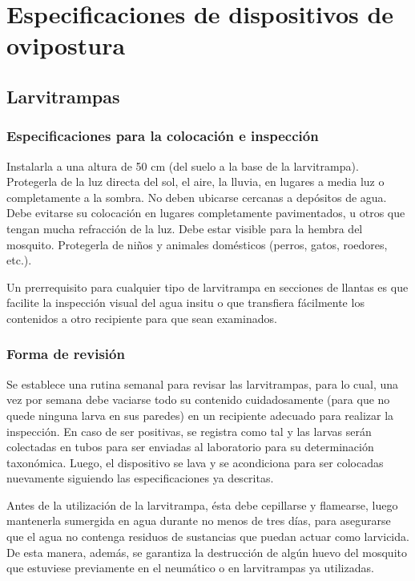 \chapter{Especificaciones de dispositivos de ovipostura}

\section{Larvitrampas}

\subsection{Especificaciones para la colocación e inspección}
Instalarla a una altura de 50 cm (del suelo a la base de la larvitrampa). Protegerla de la luz
directa del sol, el aire, la lluvia, en lugares a media luz o completamente a la sombra. No deben
ubicarse cercanas a depósitos de agua. Debe evitarse su colocación en lugares completamente
pavimentados, u otros que tengan mucha refracción de la luz. Debe estar visible para la
hembra del mosquito. Protegerla de niños y animales domésticos (perros, gatos, roedores, etc.).

Un prerrequisito para cualquier tipo de larvitrampa en secciones de llantas es que facilite la
inspección visual del agua insitu o que transfiera fácilmente los contenidos a otro recipiente
para que sean examinados.

\subsection{Forma de revisión}
Se establece una rutina semanal para revisar las larvitrampas, para lo cual, una vez por semana
debe vaciarse todo su contenido cuidadosamente (para que no quede ninguna larva en sus paredes) en
un recipiente adecuado para realizar la inspección. En caso de ser positivas, se registra como tal
y las larvas serán colectadas en tubos para ser enviadas al laboratorio para su determinación
taxonómica. Luego, el dispositivo se lava y se acondiciona para ser colocadas nuevamente siguiendo
las especificaciones ya descritas.

Antes de la utilización de la larvitrampa, ésta debe cepillarse y flamearse, luego mantenerla
sumergida en agua durante no menos de tres días, para asegurarse que el agua no contenga residuos
de sustancias que puedan actuar como larvicida. De esta manera, además, se garantiza la
destrucción de algún huevo del mosquito que estuviese previamente en el neumático o en
larvitrampas ya utilizadas.

